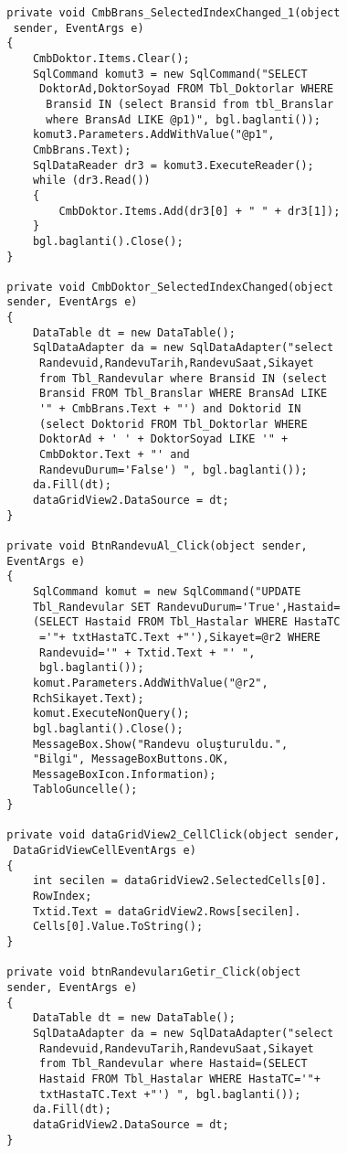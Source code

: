 \begin{lstlisting}
        private void CmbBrans_SelectedIndexChanged_1(object
         sender, EventArgs e)
        {
            CmbDoktor.Items.Clear();
            SqlCommand komut3 = new SqlCommand("SELECT
             DoktorAd,DoktorSoyad FROM Tbl_Doktorlar WHERE
              Bransid IN (select Bransid from tbl_Branslar 
              where BransAd LIKE @p1)", bgl.baglanti());
            komut3.Parameters.AddWithValue("@p1", 
            CmbBrans.Text);
            SqlDataReader dr3 = komut3.ExecuteReader();
            while (dr3.Read())
            {
                CmbDoktor.Items.Add(dr3[0] + " " + dr3[1]);
            }
            bgl.baglanti().Close();
        }

        private void CmbDoktor_SelectedIndexChanged(object 
        sender, EventArgs e)
        {
            DataTable dt = new DataTable();
            SqlDataAdapter da = new SqlDataAdapter("select
             Randevuid,RandevuTarih,RandevuSaat,Sikayet 
             from Tbl_Randevular where Bransid IN (select 
             Bransid FROM Tbl_Branslar WHERE BransAd LIKE 
             '" + CmbBrans.Text + "') and Doktorid IN 
             (select Doktorid FROM Tbl_Doktorlar WHERE 
             DoktorAd + ' ' + DoktorSoyad LIKE '" + 
             CmbDoktor.Text + "' and 
             RandevuDurum='False') ", bgl.baglanti());
            da.Fill(dt);
            dataGridView2.DataSource = dt;
        }

        private void BtnRandevuAl_Click(object sender, 
        EventArgs e)
        {
            SqlCommand komut = new SqlCommand("UPDATE 
            Tbl_Randevular SET RandevuDurum='True',Hastaid=
            (SELECT Hastaid FROM Tbl_Hastalar WHERE HastaTC
             ='"+ txtHastaTC.Text +"'),Sikayet=@r2 WHERE 
             Randevuid='" + Txtid.Text + "' ", 
             bgl.baglanti());
            komut.Parameters.AddWithValue("@r2", 
            RchSikayet.Text);
            komut.ExecuteNonQuery();
            bgl.baglanti().Close();
            MessageBox.Show("Randevu oluşturuldu.", 
            "Bilgi", MessageBoxButtons.OK, 
            MessageBoxIcon.Information);
            TabloGuncelle();
        }

        private void dataGridView2_CellClick(object sender,
         DataGridViewCellEventArgs e)
        {
            int secilen = dataGridView2.SelectedCells[0].
            RowIndex;
            Txtid.Text = dataGridView2.Rows[secilen].
            Cells[0].Value.ToString(); 
        }

        private void btnRandevularıGetir_Click(object 
        sender, EventArgs e)
        {
            DataTable dt = new DataTable();
            SqlDataAdapter da = new SqlDataAdapter("select
             Randevuid,RandevuTarih,RandevuSaat,Sikayet 
             from Tbl_Randevular where Hastaid=(SELECT 
             Hastaid FROM Tbl_Hastalar WHERE HastaTC='"+ 
             txtHastaTC.Text +"') ", bgl.baglanti());
            da.Fill(dt);
            dataGridView2.DataSource = dt;
        }


\end{lstlisting}
